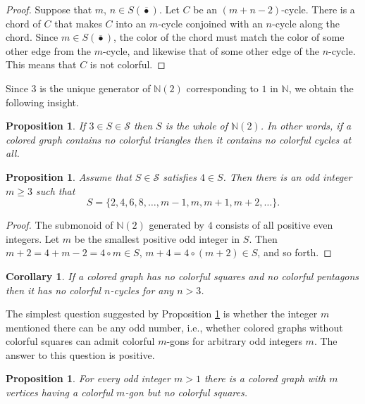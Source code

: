 \documentclass[12pt]{amsart}
\theoremstyle{plain}
\newtheorem{corollary}[theorem]{Corollary}
\newtheorem{proposition}[theorem]{Proposition}
\numberwithin{equation}{section}
\begin{document}
\begin{proof}
Suppose that $m$, $n\in S(\overline{\bullet})$. Let $C$ be an $(m+n-2)$-cycle.
There is a chord of $C$ that makes $C$ into an $m$-cycle conjoined with an
$n$-cycle along the chord. Since $m\in S\left( \overline{\bullet}\right)  $,
the color of the chord must match the color of some other edge from the
$m$-cycle, and likewise that of some other edge of the $n$-cycle. This means
that $C$ is not colorful.
\end{proof}

Since $3$ is the unique generator of $\mathbb{N}(2)$ corresponding to $1$ in
$\mathbb{N}$, we obtain the following insight.

\begin{proposition}
\label{Pr:3=All}If $3\in S\in\mathcal{S}$ then $S$ is the whole of
$\mathbb{N}(2)$. In other words, if a colored graph contains no colorful
triangles then it contains no colorful cycles at all.
\end{proposition}

\begin{proposition}
\label{Pr:4S} Assume that $S\in\mathcal{S}$ satisfies $4\in S$. Then there is
an odd integer $m\geq3$ such that
\begin{displaymath}
    S=\{2,4,6,8,\dots,m-1,m,m+1,m+2,\dots\}.
\end{displaymath}
\end{proposition}

\begin{proof}
The submonoid of $\mathbb{N}(2)$ generated by $4$ consists of all positive
even integers. Let $m$ be the smallest positive odd integer in $S$. Then
$m+2=4+m-2=4\circ m\in S$, $m+4=4\circ(m+2)\in S$, and so forth.
\end{proof}

\begin{corollary}
\label{Cr:4S} If a colored graph has no colorful squares and no colorful
pentagons then it has no colorful $n$-cycles for any $n>3$.
\end{corollary}

The simplest question suggested by Proposition \ref{Pr:4S} is whether the
integer $m$ mentioned there can be any odd number, i.e., whether colored
graphs without colorful squares can admit colorful $m$-gons for arbitrary odd
integers $m$. The answer to this question is positive.

\begin{proposition}
\label{Pr:4S2}For every odd integer $m>1$ there is a colored graph with $m$
vertices having a colorful $m$-gon but no colorful squares.
\end{proposition}
\end{document}
